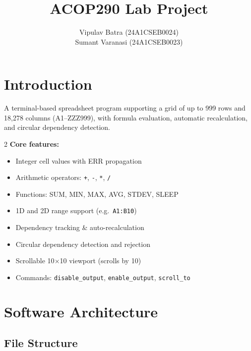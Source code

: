 \documentclass[11pt,a4paper]{article}
\title{ ACOP290 Lab Project}
\author{
Vipulav Batra (24A1CSEB0024) \\
Sumant Varanasi (24A1CSEB0023)
}
\begin{document}
\maketitle
\vspace{-1em}

\section{Introduction}

A terminal-based spreadsheet program supporting a grid of up to 999 rows and 18,278 columns (A1--ZZZ999), with formula evaluation, automatic recalculation, and circular dependency detection.

\begin{multicols}{2}
\textbf{Core features:}
\begin{itemize}
    \item Integer cell values with ERR propagation
    \item Arithmetic operators: \texttt{+}, \texttt{-}, \texttt{*}, \texttt{/}
    \item Functions: SUM, MIN, MAX, AVG, STDEV, SLEEP
    \item 1D and 2D range support (e.g.\ \texttt{A1:B10})
    \item Dependency tracking \& auto-recalculation
    \item Circular dependency detection and rejection
    \item Scrollable 10$\times$10 viewport (scrolls by 10)
    \item Commands: \texttt{disable\_output}, \texttt{enable\_output}, \texttt{scroll\_to}
\end{itemize}
\end{multicols}

\section{Software Architecture}

\subsection{File Structure}
\end{document}
